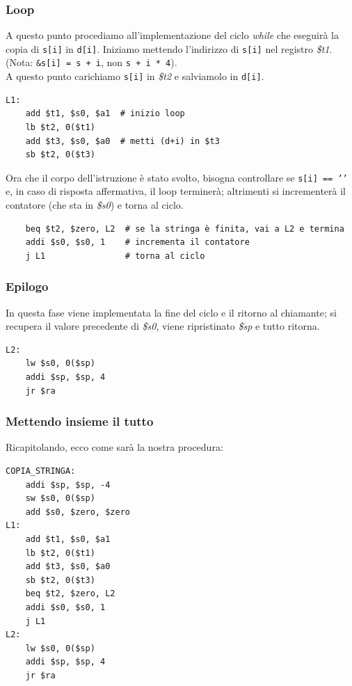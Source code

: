 \documentclass[class=book, crop=false]{standalone}
\begin{document}
\subsubsection{Loop}
A questo punto procediamo all'implementazione del ciclo \emph{while} che eseguirà la copia di \texttt{s[i]} in \texttt{d[i]}. Iniziamo mettendo l'indirizzo di \texttt{s[i]} nel registro \emph{\$t1}.\\
(Nota: \texttt{&s[i] = s + i}, non \texttt{s + i * 4}).\\
A questo punto carichiamo \texttt{s[i]}
in \emph{\$t2} e salviamolo in \texttt{d[i]}.
\begin{verbatim}
L1:
	add $t1, $s0, $a1  # inizio loop
	lb $t2, 0($t1)
	add $t3, $s0, $a0  # metti (d+i) in $t3
	sb $t2, 0($t3)
\end{verbatim}
Ora che il corpo dell'istruzione è stato svolto, bisogna controllare se \texttt{s[i] == '\0'} e, in caso di risposta affermativa, il loop terminerà; altrimenti si incrementerà il contatore (che sta in \emph{\$s0}) e torna al ciclo.
\begin{verbatim}
	beq $t2, $zero, L2  # se la stringa è finita, vai a L2 e termina
	addi $s0, $s0, 1    # incrementa il contatore
	j L1                # torna al ciclo
\end{verbatim}

\subsubsection{Epilogo}
In questa fase viene implementata la fine del ciclo e il ritorno al chiamante; si recupera il valore precedente di \emph{\$s0}, viene ripristinato \emph{\$sp} e tutto ritorna.
\begin{verbatim}
L2:
	lw $s0, 0($sp)
	addi $sp, $sp, 4
	jr $ra
\end{verbatim}

\subsubsection{Mettendo insieme il tutto}
Ricapitolando, ecco come sarà la nostra procedura:
\begin{verbatim}
COPIA_STRINGA:
	addi $sp, $sp, -4
	sw $s0, 0($sp)
	add $s0, $zero, $zero
L1:
	add $t1, $s0, $a1
	lb $t2, 0($t1)
	add $t3, $s0, $a0
	sb $t2, 0($t3)
	beq $t2, $zero, L2
	addi $s0, $s0, 1
	j L1
L2:
	lw $s0, 0($sp)
	addi $sp, $sp, 4
	jr $ra
\end{verbatim}
\end{document}
